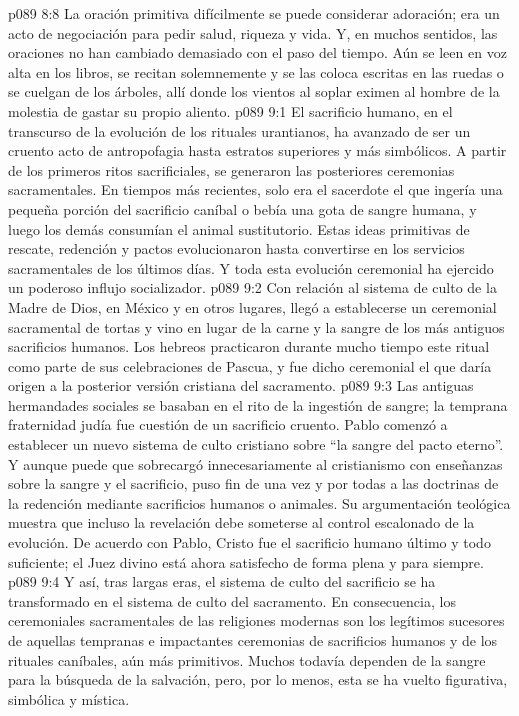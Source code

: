 \vs p089 8:8 La oración primitiva difícilmente se puede considerar adoración; era un acto de negociación para pedir salud, riqueza y vida. Y, en muchos sentidos, las oraciones no han cambiado demasiado con el paso del tiempo. Aún se leen en voz alta en los libros, se recitan solemnemente y se las coloca escritas en las ruedas o se cuelgan de los árboles, allí donde los vientos al soplar eximen al hombre de la molestia de gastar su propio aliento.
\vs p089 9:1 El sacrificio humano, en el transcurso de la evolución de los rituales urantianos, ha avanzado de ser un cruento acto de antropofagia hasta estratos superiores y más simbólicos. A partir de los primeros ritos sacrificiales, se generaron las posteriores ceremonias sacramentales. En tiempos más recientes, solo era el sacerdote el que ingería una pequeña porción del sacrificio caníbal o bebía una gota de sangre humana, y luego los demás consumían el animal sustitutorio. Estas ideas primitivas de rescate, redención y pactos evolucionaron hasta convertirse en los servicios sacramentales de los últimos días. Y toda esta evolución ceremonial ha ejercido un poderoso influjo socializador.
\vs p089 9:2 Con relación al sistema de culto de la Madre de Dios, en México y en otros lugares, llegó a establecerse un ceremonial sacramental de tortas y vino en lugar de la carne y la sangre de los más antiguos sacrificios humanos. Los hebreos practicaron durante mucho tiempo este ritual como parte de sus celebraciones de Pascua, y fue dicho ceremonial el que daría origen a la posterior versión cristiana del sacramento.
\vs p089 9:3 Las antiguas hermandades sociales se basaban en el rito de la ingestión de sangre; la temprana fraternidad judía fue cuestión de un sacrificio cruento. Pablo comenzó a establecer un nuevo sistema de culto cristiano sobre “la sangre del pacto eterno”. Y aunque puede que sobrecargó innecesariamente al cristianismo con enseñanzas sobre la sangre y el sacrificio, puso fin de una vez y por todas a las doctrinas de la redención mediante sacrificios humanos o animales. Su argumentación teológica muestra que incluso la revelación debe someterse al control escalonado de la evolución. De acuerdo con Pablo, Cristo fue el sacrificio humano último y todo suficiente; el Juez divino está ahora satisfecho de forma plena y para siempre.
\vs p089 9:4 Y así, tras largas eras, el sistema de culto del sacrificio se ha transformado en el sistema de culto del sacramento. En consecuencia, los ceremoniales sacramentales de las religiones modernas son los legítimos sucesores de aquellas tempranas e impactantes ceremonias de sacrificios humanos y de los rituales caníbales, aún más primitivos. Muchos todavía dependen de la sangre para la búsqueda de la salvación, pero, por lo menos, esta se ha vuelto figurativa, simbólica y mística.
